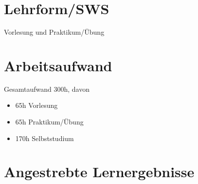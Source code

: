 \hypertarget{lehrformswspathlabelmi-2017modulbeschreibungen-bachelorba_mensch-computer_interaktion}{%
\section*{Lehrform/SWS\label{/mi-2017/modulbeschreibungen-bachelor/BA_Mensch-Computer_Interaktion}}\label{lehrformswspathlabelmi-2017modulbeschreibungen-bachelorba_mensch-computer_interaktion}}

Vorlesung und Praktikum/Übung

\hypertarget{arbeitsaufwandpathlabelmi-2017modulbeschreibungen-bachelorba_mensch-computer_interaktion}{%
\section*{Arbeitsaufwand\label{/mi-2017/modulbeschreibungen-bachelor/BA_Mensch-Computer_Interaktion}}\label{arbeitsaufwandpathlabelmi-2017modulbeschreibungen-bachelorba_mensch-computer_interaktion}}

Gesamtaufwand 300h, davon

\begin{itemize}
\tightlist
\item
  65h Vorlesung
\item
  65h Praktikum/Übung
\item
  170h Selbststudium
\end{itemize}

\hypertarget{angestrebte-lernergebnissepathlabelmi-2017modulbeschreibungen-bachelorba_mensch-computer_interaktion}{%
\section*{Angestrebte
Lernergebnisse\label{/mi-2017/modulbeschreibungen-bachelor/BA_Mensch-Computer_Interaktion}}\label{angestrebte-lernergebnissepathlabelmi-2017modulbeschreibungen-bachelorba_mensch-computer_interaktion}}

